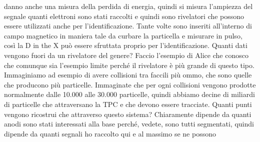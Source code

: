 {danno anche una misura della perdida di energia, quindi si misura l'ampiezza del segnale quanti elettroni sono stati raccolti e quindi sono rivelatori che possono essere utilizzati anche per l'identificazione. Tante volte sono inseriti all'interno di campo magnetico in maniera tale da curbare la particella e misurare in pulso, così la D in the X può essere sfruttata proprio per l'identificazione. Quanti dati vengono fuori da un rivelatore del genere? Faccio l'esempio di Alice che conosco che comunque sia l'esempio limite perché il rivelatore è più grande di questo tipo. Immaginiamo ad esempio di avere collisioni tra faccili più ommo, che sono quelle che producono più particelle. Immaginate che per ogni collisioni vengono prodotte normalmente dalle 10.000 alle 30.000 particelle, quindi abbiamo decine di miliardi di particelle che attraversano la TPC e che devono essere tracciate. Quanti punti vengono ricostrui che attraverso questo sistema? Chiaramente dipende da quanti anodi sono stati interessati alla base perché, vedete, sono tutti segmentati, quindi dipende da quanti segnali ho raccolto qui e al massimo se ne possono 

}
